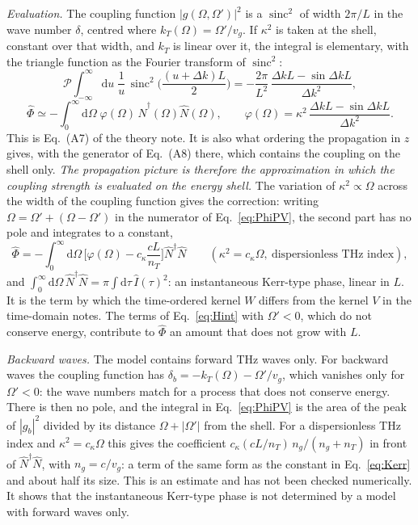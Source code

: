 \documentclass[aps,pra,onecolumn,notitlepage,11pt,amsmath,amssymb,nofootinbib]{revtex4-2}
\newcommand{\Nop}{\hat N}
\newcommand{\Iop}{\hat I}
\newcommand{\dd}{\mathrm{d}}
\newcommand{\sinc}{\operatorname{sinc}}
\newcommand{\PV}{\mathcal P}
\begin{document}
\emph{Evaluation.} The coupling function $|g(\Omega,\Omega')|^2$ is a
$\sinc^2$ of width $2\pi/L$ in the wave number $\delta$, centred where
$k_T(\Omega)=\Omega'/v_g$. If $\kappa^2$ is taken at the shell, constant over
that width, and $k_T$ is linear over it, the integral is elementary, with
the triangle function as the Fourier transform of $\sinc^2$:
\begin{equation}
\PV\!\!\int_{-\infty}^{\infty}\!\!\dd u\;\frac{1}{u}\,\sinc^2\!\Big(\frac{(u+\Delta k)L}{2}\Big)
=-\frac{2\pi}{L^2}\,\frac{\Delta kL-\sin\Delta kL}{\Delta k^2},
\label{eq:pvint}
\end{equation}
\begin{equation}
\hat\Phi\simeq-\int_0^\infty\!\!\dd\Omega\;\varphi(\Omega)\,\Nop^\dagger(\Omega)\Nop(\Omega),
\qquad
\varphi(\Omega)=\kappa^2\,\frac{\Delta kL-\sin\Delta kL}{\Delta k^2}.
\label{eq:phi}
\end{equation}
This is Eq.~(A7) of the theory note. It is also what ordering the propagation
in $z$ gives, with the generator of Eq.~(A8) there, which contains the
coupling on the shell only. \emph{The propagation picture is therefore the
approximation in which the coupling strength is evaluated on the energy
shell.} The variation of $\kappa^2\propto\Omega$ across the width of the
coupling function gives the correction: writing
$\Omega=\Omega'+(\Omega-\Omega')$ in the numerator of Eq.~\eqref{eq:PhiPV},
the second part has no pole and integrates to a constant,
\begin{equation}
\hat\Phi=-\int_0^\infty\!\!\dd\Omega\,\Big[\varphi(\Omega)-c_\kappa\frac{cL}{n_T}\Big]\Nop^\dagger\Nop
\qquad(\kappa^2=c_\kappa\Omega,\ \text{dispersionless THz index}),
\label{eq:Kerr}
\end{equation}
and $\int_0^\infty\dd\Omega\,\Nop^\dagger\Nop=\pi\int\dd\tau\,\Iop(\tau)^2$: an
instantaneous Kerr-type phase, linear in $L$. It is the term by which the
time-ordered kernel $W$ differs from the kernel $V$ in the time-domain
notes. The terms of Eq.~\eqref{eq:Hint} with $\Omega'<0$, which do not
conserve energy, contribute to $\hat\Phi$ an amount that does not grow with
$L$.

\emph{Backward waves.} The model contains forward THz waves only. For
backward waves the coupling function has $\delta_b=-k_T(\Omega)-\Omega'/v_g$,
which vanishes only for $\Omega'<0$: the wave numbers match for a process
that does not conserve energy. There is then no pole, and the integral in
Eq.~\eqref{eq:PhiPV} is the area of the peak of $|g_b|^2$ divided by its
distance $\Omega+|\Omega'|$ from the shell. For a dispersionless THz index and
$\kappa^2=c_\kappa\Omega$ this gives the coefficient
$c_\kappa(cL/n_T)\,n_g/(n_g+n_T)$ in front of $\Nop^\dagger\Nop$, with
$n_g=c/v_g$: a term of the same form as the constant in Eq.~\eqref{eq:Kerr}
and about half its size. This is an estimate and has not been checked
numerically. It shows that the instantaneous Kerr-type phase is not
determined by a model with forward waves only.
\end{document}
